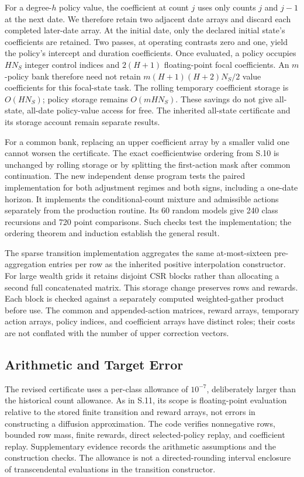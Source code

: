 For a degree-$h$ policy value, the coefficient at count $j$ uses only counts $j$ and $j-1$ at the next date. We therefore retain two adjacent date arrays and discard each completed later-date array. At the initial date, only the declared initial state's coefficients are retained. Two passes, at operating contrasts zero and one, yield the policy's intercept and duration coefficients. Once evaluated, a policy occupies $HN_S$ integer control indices and $2(H+1)$ floating-point focal coefficients. An $m$-policy bank therefore need not retain $m(H+1)(H+2)N_S/2$ value coefficients for this focal-state task. The rolling temporary coefficient storage is $O(HN_S)$; policy storage remains $O(mHN_S)$. These savings do not give all-state, all-date policy-value access for free. The inherited all-state certificate and its storage account remain separate results.

For a common bank, replacing an upper coefficient array by a smaller valid one cannot worsen the certificate. The exact coefficientwise ordering from S.10 is unchanged by rolling storage or by splitting the first-action mask after common continuation. The new independent dense program tests the paired implementation for both adjustment regimes and both signs, including a one-date horizon. It implements the conditional-count mixture and admissible actions separately from the production routine. Its 60 random models give 240 class recursions and 720 point comparisons. Such checks test the implementation; the ordering theorem and induction establish the general result.

The sparse transition implementation aggregates the same at-most-sixteen pre-aggregation entries per row as the inherited positive interpolation constructor. For large wealth grids it retains disjoint CSR blocks rather than allocating a second full concatenated matrix. This storage change preserves rows and rewards. Each block is checked against a separately computed weighted-gather product before use. The common and appended-action matrices, reward arrays, temporary action arrays, policy indices, and coefficient arrays have distinct roles; their costs are not conflated with the number of upper correction vectors.

\subsection{Arithmetic and Target Error}
The revised certificate uses a per-class allowance of $10^{-7}$, deliberately larger than the historical count allowance. As in S.11, its scope is floating-point evaluation relative to the stored finite transition and reward arrays, not errors in constructing a diffusion approximation. The code verifies nonnegative rows, bounded row mass, finite rewards, direct selected-policy replay, and coefficient replay. Supplementary evidence records the arithmetic assumptions and the construction checks. The allowance is not a directed-rounding interval enclosure of transcendental evaluations in the transition constructor.

